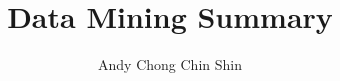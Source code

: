 \documentclass[12pt,twoside,a4paper]{report}
\title{Data Mining Summary}
\author{Andy Chong Chin Shin}
\begin{document}
\titleGM

\tableofcontents




















\end{document}
